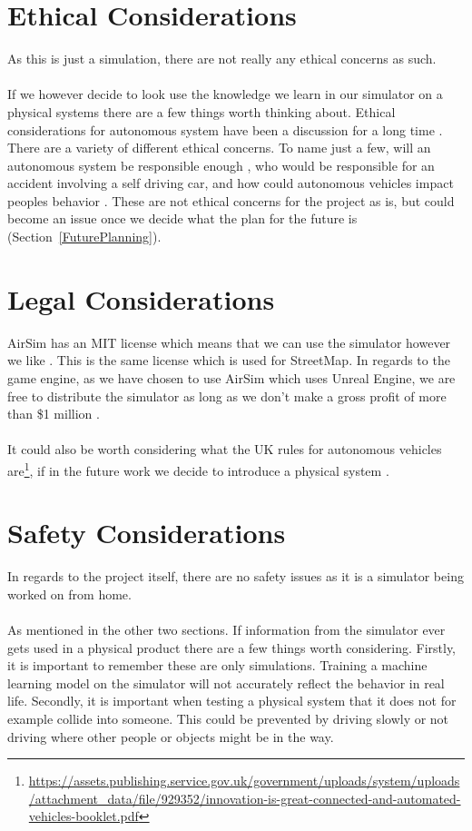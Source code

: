 \section{Ethical Considerations}
As this is just a simulation, there are not really any ethical concerns as such. 
\\~\\
If we however decide to look use the knowledge we learn in our simulator on a physical systems there are a few things worth thinking about. Ethical considerations for autonomous system have been a discussion for a long time \cite{ArkinRonaldC2016EaAS, BorensteinJason2019SCaE}. There are a variety of different ethical concerns. To name just a few, will an autonomous system be responsible enough \cite{BorensteinJason2019SCaE}, who would be responsible for an accident involving a self driving car, and how could autonomous vehicles impact peoples behavior \cite{moralComputers}. These are not ethical concerns for the project as is, but could become an issue once we decide what the plan for the future is (Section~\ref{FuturePlanning}). 

\section{Legal Considerations}
AirSim has an MIT license which means that we can use the simulator however we like \cite{MITLicense}. This is the same license which is used for StreetMap. In regards to the game engine, as we have chosen to use AirSim which uses Unreal Engine, we are free to distribute the simulator as long as we don't make a gross profit of more than \$1 million \cite{UE5}. 
\\~\\
It could also be worth considering what the UK rules for autonomous vehicles are\footnote{\url{https://assets.publishing.service.gov.uk/government/uploads/system/uploads/attachment_data/file/929352/innovation-is-great-connected-and-automated-vehicles-booklet.pdf}}, if in the future work we decide to introduce a physical system \cite{UKAutoRules, UKAutoRulesGov2}. 


\section{Safety Considerations}
In regards to the project itself, there are no safety issues as it is a simulator being worked on from home. 
\\~\\
As mentioned in the other two sections. If information from the simulator ever gets used in a physical product there are a few things worth considering. Firstly, it is important to remember these are only simulations. Training a machine learning model on the simulator will not accurately reflect the behavior in real life. Secondly, it is important when testing a physical system that it does not for example collide into someone. This could be prevented by driving slowly or not driving where other people or objects might be in the way.